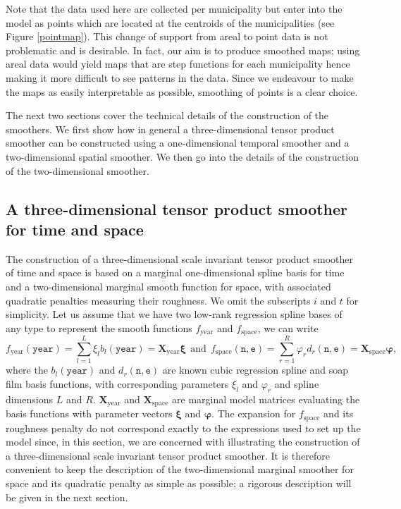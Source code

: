 \documentclass[12pt]{article}
\theoremstyle{definition}
\theoremstyle{plain}
\begin{document}
Note that the data used here are collected per municipality but enter into the model as points which are located at the centroids of the municipalities (see Figure \ref{pointmap}). This change of support from areal to point data is not problematic and is desirable. In fact, our aim is to produce smoothed maps; using areal data would yield maps that are step functions for each municipality hence making it more difficult to see patterns in the data. Since we endeavour to make the maps as easily interpretable as possible, smoothing of points is a clear choice.

The next two sections cover the technical details of the construction of the smoothers. We first show how in general a three-dimensional tensor product smoother can be constructed using a one-dimensional temporal smoother and a two-dimensional spatial smoother. We then go into the details of the construction of the two-dimensional smoother.

\subsection{A three-dimensional tensor product smoother for time and space \label{3D}}

The construction of a three-dimensional scale invariant tensor product smoother of time and space is based on a marginal one-dimensional spline basis for time and a two-dimensional marginal smooth function for space, with associated quadratic penalties measuring their roughness. We omit the subscripts $i$ and $t$ for simplicity. Let us assume that we have two low-rank regression spline bases of any type to represent the smooth functions $f_\text{year}$ and $f_\text{space}$, we can write
$$
f_\text{year}(\texttt{year})=\sum_{l=1}^L \xi_l b_l(\texttt{year})=\textbf{X}_\text{year}\bm\xi \ \ \text{and} \ \ f_\text{space}(\texttt{n},\texttt{e})=\sum_{r=1}^R \varphi_r d_r(\texttt{n},\texttt{e})=\textbf{X}_\text{space}\bm\varphi,
$$
where the $b_l(\texttt{year})$ and $d_r(\texttt{n},\texttt{e})$ are known cubic regression spline and soap film basis functions, with corresponding parameters $\xi_l$ and $\varphi_r$ and spline dimensions $L$ and $R$. $\textbf{X}_\text{year}$ and $\textbf{X}_\text{space}$ are marginal model matrices evaluating the basis functions with parameter vectors $\bm\xi$ and $\bm\varphi$. The expansion for $f_\text{space}$ and its roughness penalty do not correspond exactly to the expressions used to set up the model since, in this section, we are concerned with illustrating the construction of a three-dimensional scale invariant tensor product smoother. It is therefore convenient to keep the description of the two-dimensional marginal smoother for space and its quadratic penalty as simple as possible; a rigorous description will be given in the next section. 
\end{document}
